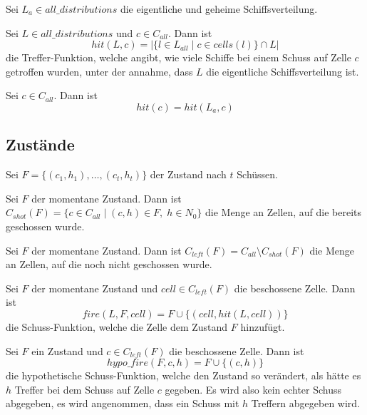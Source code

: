 \documentclass[a4paper,12pt]{llncs}
\numberwithin{equation}{section}
\begin{document}
\begin{definition}
Sei $L_a \in all\_distributions$ die eigentliche und geheime Schiffsverteilung.
\end{definition}

\begin{definition}
Sei $L \in all\_distributions$ und $c \in C_{all}$.
Dann ist 
\[
hit(L, c)=|\{l \in L_{all} \mid c \in cells(l)\} \cap L|
\]
die Treffer-Funktion, welche angibt, wie viele Schiffe bei einem Schuss auf Zelle $c$ getroffen wurden, unter der annahme, dass $L$ die eigentliche Schiffsverteilung ist.
\end{definition}

\begin{definition}
Sei $c \in C_{all}$.
Dann ist 
\[
hit(c)=hit(L_a, c)
\]
\end{definition}

\subsection{Zustände}

\begin{definition}
Sei $F=\{(c_1, h_1), \dots , (c_t, h_t)\}$ der Zustand nach $t$ Schüssen.
\end{definition}

\begin{definition}
Sei $F$ der momentane Zustand.
Dann ist $C_{shot}(F)=\{c \in C_{all} \mid (c,h) \in F, \; h \in N_0\}$ die Menge an Zellen, auf die bereits geschossen wurde.
\end{definition}

\begin{definition}
Sei $F$ der momentane Zustand.
Dann ist $C_{left}(F)=C_{all} \setminus C_{shot}(F)$ die Menge an Zellen, auf die noch nicht geschossen wurde.
\end{definition}

\begin{definition}
Sei $F$ der momentane Zustand und $cell \in C_{left}(F)$ die beschossene Zelle.
Dann ist
\[
fire(L, F, cell)=F \cup \{(cell,hit(L, cell))\}
\]
die Schuss-Funktion, welche die Zelle dem Zustand $F$ hinzufügt.
\end{definition}

\begin{definition}
Sei $F$ ein Zustand und $c \in C_{left}(F)$ die beschossene Zelle.
Dann ist
\[
hypo\_fire(F, c, h)=F \cup \{(c, h)\}
\]
die hypothetische Schuss-Funktion, welche den Zustand so verändert, als hätte es $h$ Treffer bei dem Schuss auf Zelle $c$ gegeben. Es wird also kein echter Schuss abgegeben, es wird angenommen, dass ein Schuss mit $h$ Treffern abgegeben wird.
\end{definition}
\end{document}
